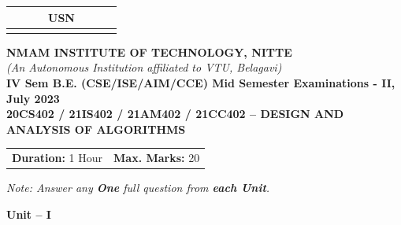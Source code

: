 \documentclass[12pt,a4paper]{article}
\begin{document}
\begin{center}
\begin{tabular}{|c|c|c|c|c|c|c|c|c|c|}
\hline
\multicolumn{10}{|c|}{USN} \\
\hline
& & & & & & & & & \\
\hline
\end{tabular}

\vspace{0.4cm}

{\Large \textbf{NMAM INSTITUTE OF TECHNOLOGY, NITTE}}\\[0.2cm]
{\small \textit{(An Autonomous Institution affiliated to VTU, Belagavi)}}\\[0.2cm]
{\large \textbf{IV Sem B.E. (CSE/ISE/AIM/CCE) Mid Semester Examinations - II, July 2023}}\\[0.2cm]
{\large \textbf{20CS402 / 21IS402 / 21AM402 / 21CC402 -- DESIGN AND ANALYSIS OF ALGORITHMS}}\\[0.2cm]
\end{center}

\noindent
\begin{tabular}{p{8cm}r}
\textbf{Duration:} 1 Hour & \textbf{Max. Marks:} 20
\end{tabular}

\vspace{0.2cm}
\begin{center}
\textit{Note: Answer any \textbf{One} full question from \textbf{each Unit}.}
\end{center}

\vspace{0.2cm}

\begin{center}
{\large \textbf{Unit -- I}}
\end{center}
\end{document}
